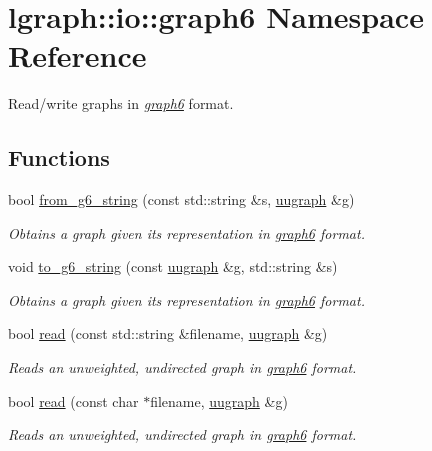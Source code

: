 \hypertarget{namespacelgraph_1_1io_1_1graph6}{\section{lgraph\-:\-:io\-:\-:graph6 Namespace Reference}
\label{namespacelgraph_1_1io_1_1graph6}
}


Read/write graphs in {\itshape \hyperlink{namespacelgraph_1_1io_1_1graph6}{graph6}} format.  


\subsection*{Functions}
\begin{DoxyCompactItemize}
\item 
bool \hyperlink{namespacelgraph_1_1io_1_1graph6_aa0785d218fed2cfc2056c3ae4b1bdc84}{from\-\_\-g6\-\_\-string} (const std\-::string \&s, \hyperlink{classlgraph_1_1uugraph}{uugraph} \&g)
\begin{DoxyCompactList}\small\item\em Obtains a graph given its representation in {\itshape \hyperlink{namespacelgraph_1_1io_1_1graph6}{graph6}} format. \end{DoxyCompactList}\item 
void \hyperlink{namespacelgraph_1_1io_1_1graph6_a89dba61410e4fe01ab54b0a8e476942e}{to\-\_\-g6\-\_\-string} (const \hyperlink{classlgraph_1_1uugraph}{uugraph} \&g, std\-::string \&s)
\begin{DoxyCompactList}\small\item\em Obtains a graph given its representation in {\itshape \hyperlink{namespacelgraph_1_1io_1_1graph6}{graph6}} format. \end{DoxyCompactList}\item 
bool \hyperlink{namespacelgraph_1_1io_1_1graph6_acf631cd214582c5fb67d4766bc3f1270}{read} (const std\-::string \&filename, \hyperlink{classlgraph_1_1uugraph}{uugraph} \&g)
\begin{DoxyCompactList}\small\item\em Reads an unweighted, undirected graph in {\itshape \hyperlink{namespacelgraph_1_1io_1_1graph6}{graph6}} format. \end{DoxyCompactList}\item 
bool \hyperlink{namespacelgraph_1_1io_1_1graph6_a4100b07dc643c2fda1dd4cd2deb80a59}{read} (const char $\ast$filename, \hyperlink{classlgraph_1_1uugraph}{uugraph} \&g)
\begin{DoxyCompactList}\small\item\em Reads an unweighted, undirected graph in {\itshape \hyperlink{namespacelgraph_1_1io_1_1graph6}{graph6}} format. \end{DoxyCompactList}\item 

\end{DoxyCompactItemize}
